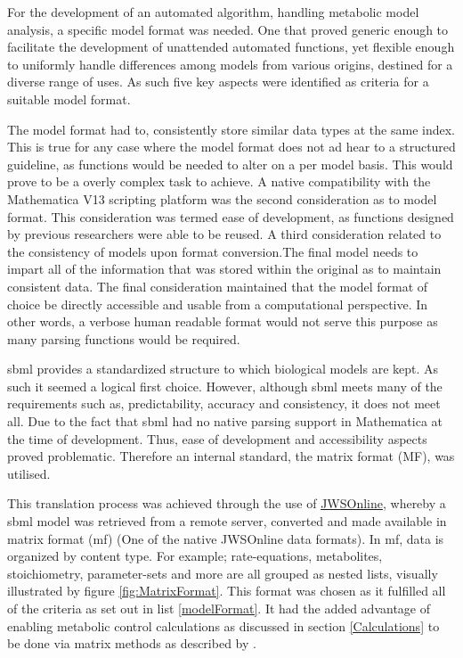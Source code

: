 For the development of an automated algorithm, handling metabolic model analysis, a specific model format was needed. One that proved generic enough to facilitate the development of unattended automated functions, yet flexible enough to uniformly handle differences among models from various origins, destined for a diverse range of uses. As such five key aspects were identified as criteria for a suitable model format.

The model format had to, consistently store similar data types at the same index. This is true for any case where the model format does not ad hear to a structured guideline, as functions would be needed to alter on a per model basis. This would prove to be a overly complex task to achieve. A native compatibility with the Mathematica V13 scripting platform was the second consideration as to model format. This consideration was termed ease of development, as functions designed by previous researchers were able to be reused. A third consideration related to the consistency of models upon format conversion.The final model needs to impart all of the information that was stored within the original as to maintain consistent data. The final consideration maintained that the model format of choice be directly accessible and usable from a computational perspective. In other words, a verbose human readable format would not serve this purpose as many parsing functions would be required.

\gls{sbml} provides a standardized structure to which biological models are kept. As such it seemed a logical first choice. However, although \gls{sbml} meets many of the requirements such as, predictability, accuracy and consistency, it does not meet all. Due to the fact that \gls{sbml} had no native parsing support in Mathematica at the time of development. Thus, ease of development and accessibility aspects proved problematic. Therefore an internal standard, the matrix format (MF), was utilised. 

This translation process was achieved through the use of \href{https://jjj.bio.vu.nl}{JWSOnline}, whereby a \gls{sbml} model was retrieved from a remote server, converted and made available in matrix format (\gls{mf}) (One of the native JWSOnline data formats). In \gls{mf}, data is organized by content type. For example; rate-equations, metabolites, stoichiometry, parameter-sets and more are all grouped as nested lists, visually illustrated by figure \ref{fig:MatrixFormat}.  This format was chosen as it fulfilled all of the criteria as set out in list \ref{modelFormat}. It had the added advantage of enabling metabolic control calculations as discussed in section \ref{Calculations} to be done via matrix methods as described by \citeauthor{Hofmeyr2001}.


